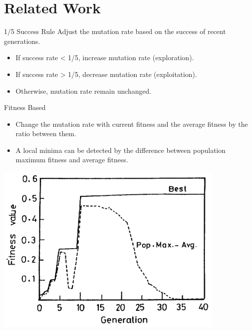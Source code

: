 \section{Related Work}
    
    \frame{\sectionpage}

    \begin{frame}{1/5 Success Rule}
        Adjust the mutation rate based on the success of recent generations. \begin{itemize}
            \item If success rate < 1/5, increase mutation rate (exploration).
            \item If success rate > 1/5, decrease mutation rate (exploitation).
            \item Otherwise, mutation rate remain unchanged.
        \end{itemize}
    \end{frame}
    
    \begin{frame}{Fitness Based}
        \begin{itemize}
            \item Change the mutation rate with current fitness and the average fitness by the ratio between them. \cite{Marsili_Libelli2000-tt}
            \item A local minima can be detected by the difference between population maximum fitness and average fitness. \cite{286385}
        \end{itemize}
        \centering
        \includegraphics[height=0.5\textheight]{images/LocalOptimaDetection.png}
    \end{frame}

